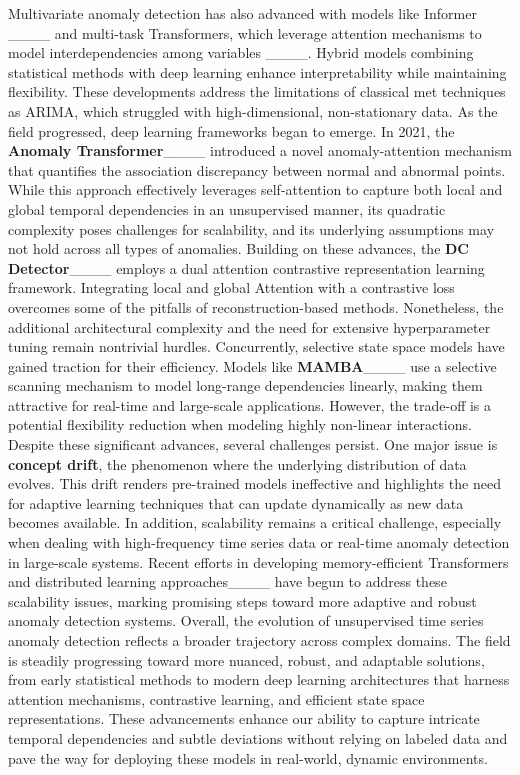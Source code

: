 Multivariate anomaly detection has also advanced with models like Informer ____ and multi-task Transformers, which leverage attention mechanisms to model interdependencies among variables ____. Hybrid models combining statistical methods with deep learning enhance interpretability while maintaining flexibility. These developments address the limitations of classical met techniques as ARIMA, which struggled with high-dimensional, non-stationary data.
As the field progressed, deep learning frameworks began to emerge. In 2021, the \textbf{Anomaly Transformer}____ introduced a novel anomaly-attention mechanism that quantifies the association discrepancy between normal and abnormal points. While this approach effectively leverages self-attention to capture both local and global temporal dependencies in an unsupervised manner, its quadratic complexity poses challenges for scalability, and its underlying assumptions may not hold across all types of anomalies.
Building on these advances, the \textbf{DC Detector}____ employs a dual attention contrastive representation learning framework. Integrating local and global Attention with a contrastive loss overcomes some of the pitfalls of reconstruction-based methods. Nonetheless, the additional architectural complexity and the need for extensive hyperparameter tuning remain nontrivial hurdles.
Concurrently, selective state space models have gained traction for their efficiency. Models like \textbf{MAMBA}____ use a selective scanning mechanism to model long-range dependencies linearly, making them attractive for real-time and large-scale applications. However, the trade-off is a potential flexibility reduction when modeling highly non-linear interactions.
Despite these significant advances, several challenges persist. One major issue is \textbf{concept drift}, the phenomenon where the underlying distribution of data evolves. This drift renders pre-trained models ineffective and highlights the need for adaptive learning techniques that can update dynamically as new data becomes available. In addition, scalability remains a critical challenge, especially when dealing with high-frequency time series data or real-time anomaly detection in large-scale systems. Recent efforts in developing memory-efficient Transformers and distributed learning approaches____ have begun to address these scalability issues, marking promising steps toward more adaptive and robust anomaly detection systems.
Overall, the evolution of unsupervised time series anomaly detection reflects a broader trajectory across complex domains. The field is steadily progressing toward more nuanced, robust, and adaptable solutions, from early statistical methods to modern deep learning architectures that harness attention mechanisms, contrastive learning, and efficient state space representations. These advancements enhance our ability to capture intricate temporal dependencies and subtle deviations without relying on labeled data and pave the way for deploying these models in real-world, dynamic environments.